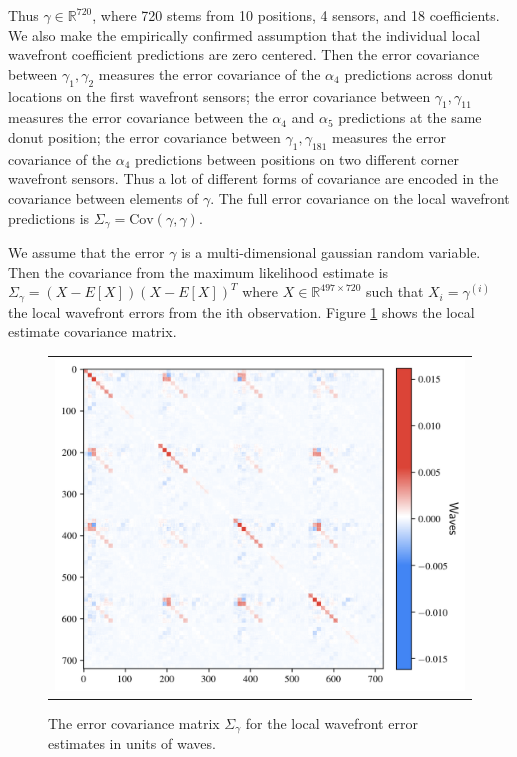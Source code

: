 \noindent Thus $\gamma \in \mathbb{R}^{720}$, where 720 stems from 10 positions, 4 sensors, and 18 coefficients. We also make the empirically confirmed assumption that the individual local wavefront coefficient predictions are zero centered. Then the error covariance between $\gamma_1, \gamma_2$ measures the error covariance of the $\alpha_4$ predictions across donut locations on the first wavefront sensors; the error covariance between $\gamma_1, \gamma_{11}$ measures the error covariance between the $\alpha_4$ and $\alpha_5$ predictions at the same donut position; the error covariance between $\gamma_1, \gamma_{181}$ measures the error covariance of the $\alpha_4$ predictions between positions on two different corner wavefront sensors. Thus a lot of different forms of covariance are encoded in the covariance between elements of $\gamma$. The full error covariance on the local wavefront predictions is $\Sigma_{\gamma} = \text{Cov}(\gamma, \gamma)$.

We assume that the error $\gamma$ is a multi-dimensional gaussian random variable. Then the covariance from the maximum likelihood estimate is $\Sigma_{\gamma} = (X - E[X])(X-E[X])^T$ where $X \in \mathbb{R}^{497 \times 720}$ such that $X_i = \gamma^{(i)}$ the local wavefront errors from the ith observation. Figure \ref{fig:large-cov} shows the local estimate covariance matrix. 

\begin{figure}[!htbp]
\begin{center}
\begin{tabular}{c}
\includegraphics[width=\textwidth]{figs/control/obs_cov_written_thesis.png}
\end{tabular}
\end{center}
\caption[Error Covariance Of Local Wavefront Estimates]{The error covariance matrix $\Sigma_{\gamma}$ for the local wavefront error estimates in units of waves.\label{fig:large-cov}}
\end{figure}

